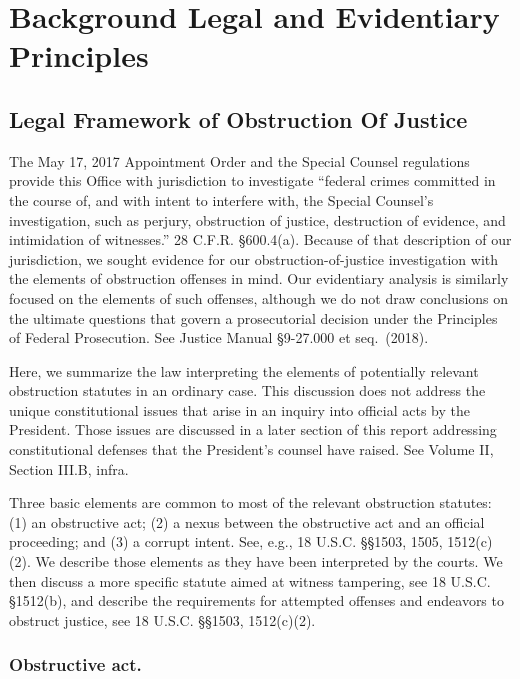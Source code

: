 \section{Background Legal and Evidentiary Principles}

\subsection{Legal Framework of Obstruction Of Justice}

The May 17, 2017 Appointment Order and the Special Counsel regulations provide this Office with jurisdiction to investigate “federal crimes committed in the course of, and with intent to interfere with, the Special Counsel's investigation, such as perjury, obstruction of justice, destruction of evidence, and intimidation of witnesses.”
28 C.F.R. \S 600.4(a).
Because of that description of our jurisdiction, we sought evidence for our obstruction-of-justice investigation with the elements of obstruction offenses in mind.
Our evidentiary analysis is similarly focused on the elements of such offenses, although we do not draw conclusions on the ultimate questions that govern a prosecutorial decision under the Principles of Federal Prosecution.
See Justice Manual \S 9-27.000 et seq.~(2018).

Here, we summarize the law interpreting the elements of potentially relevant obstruction statutes in an ordinary case.
This discussion does not address the unique constitutional issues that arise in an inquiry into official acts by the President.
Those issues are discussed in a later section of this report addressing constitutional defenses that the President’s counsel have raised. See Volume II, Section III.B, infra.

Three basic elements are common to most of the relevant obstruction statutes: (1) an obstructive act; (2) a nexus between the obstructive act and an official proceeding; and (3) a corrupt intent.
See, e.g., 18 U.S.C. \S\S 1503, 1505, 1512(c)(2).
We describe those elements as they have been interpreted by the courts.
We then discuss a more specific statute aimed at witness tampering, see 18 U.S.C. \S 1512(b), and describe the requirements for attempted offenses and endeavors to obstruct justice, see 18 U.S.C. \S\S 1503, 1512(c)(2).

\subsubsection*{Obstructive act.}

